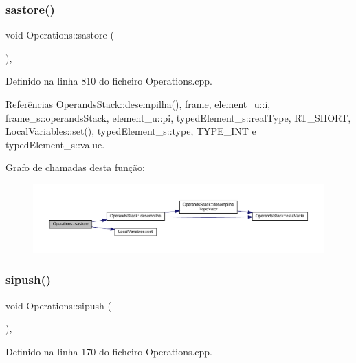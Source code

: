 \subsubsection{\texorpdfstring{sastore()}{sastore()}}
{\footnotesize\ttfamily void Operations\+::sastore (\begin{DoxyParamCaption}{ }\end{DoxyParamCaption})\hspace{0.3cm}{\ttfamily [static]}, {\ttfamily [private]}}



Definido na linha 810 do ficheiro Operations.\+cpp.



Referências Operands\+Stack\+::desempilha(), frame, element\+\_\+u\+::i, frame\+\_\+s\+::operands\+Stack, element\+\_\+u\+::pi, typed\+Element\+\_\+s\+::real\+Type, R\+T\+\_\+\+S\+H\+O\+RT, Local\+Variables\+::set(), typed\+Element\+\_\+s\+::type, T\+Y\+P\+E\+\_\+\+I\+NT e typed\+Element\+\_\+s\+::value.

Grafo de chamadas desta função\+:\nopagebreak
\begin{figure}[H]
\begin{center}
\leavevmode
\includegraphics[width=350pt]{classOperations_aab1c34c455478d75c21cdb06d6c94172_cgraph}
\end{center}
\end{figure}
\mbox{\label{classOperations_aed3838c73d7febfcacab9f101e6946ad}} 
\subsubsection{\texorpdfstring{sipush()}{sipush()}}
{\footnotesize\ttfamily void Operations\+::sipush (\begin{DoxyParamCaption}{ }\end{DoxyParamCaption})\hspace{0.3cm}{\ttfamily [static]}, {\ttfamily [private]}}



Definido na linha 170 do ficheiro Operations.\+cpp.



